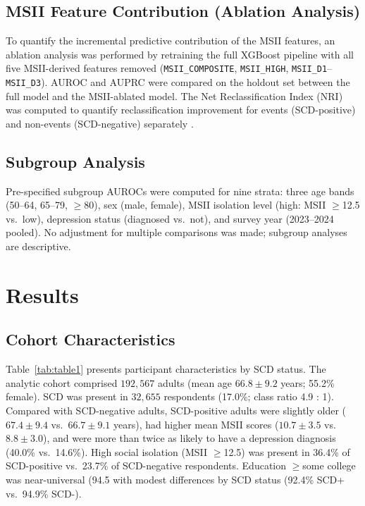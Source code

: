 \documentclass[12pt,a4paper]{article}
\begin{document}
\subsection{MSII Feature Contribution (Ablation Analysis)}

To quantify the incremental predictive contribution of the MSII features,
an ablation analysis was performed by retraining the full XGBoost pipeline
with all five MSII-derived features removed (\texttt{MSII\_COMPOSITE},
\texttt{MSII\_HIGH}, \texttt{MSII\_D1}--\texttt{MSII\_D3}).
AUROC and AUPRC were compared on the holdout set between the full model
and the MSII-ablated model. The Net Reclassification Index (NRI) was
computed to quantify reclassification improvement for events (SCD-positive)
and non-events (SCD-negative) separately \cite{Pencina2008}.

\subsection{Subgroup Analysis}

Pre-specified subgroup AUROCs were computed for nine strata: three age bands
(50--64, 65--79, $\geq$80), sex (male, female), MSII isolation level (high:
MSII $\geq$12.5 vs.\ low), depression status (diagnosed vs.\ not), and survey
year (2023--2024 pooled). No adjustment for multiple comparisons was made;
subgroup analyses are descriptive.

\section{Results}

\subsection{Cohort Characteristics}

Table~\ref{tab:table1} presents participant characteristics by SCD status. The
analytic cohort comprised $192{,}567$ adults (mean age $66.8 \pm 9.2$ years;
55.2\% female). SCD was present in $32{,}655$ respondents (17.0\%; class ratio
4.9 : 1). Compared with SCD-negative adults, SCD-positive adults were slightly
older ($67.4 \pm 9.4$ vs.\ $66.7 \pm 9.1$ years), had higher mean MSII scores
($10.7 \pm 3.5$ vs.\ $8.8 \pm 3.0$), and were more than twice as likely to have
a depression diagnosis (40.0\% vs.\ 14.6\%). High social isolation (MSII
$\geq$12.5) was present in 36.4\% of SCD-positive vs.\ 23.7\% of SCD-negative
respondents. Education $\geq$some college was near-universal (94.5%
with modest differences by SCD status (92.4\% SCD+ vs.\ 94.9\% SCD-).
\end{document}
